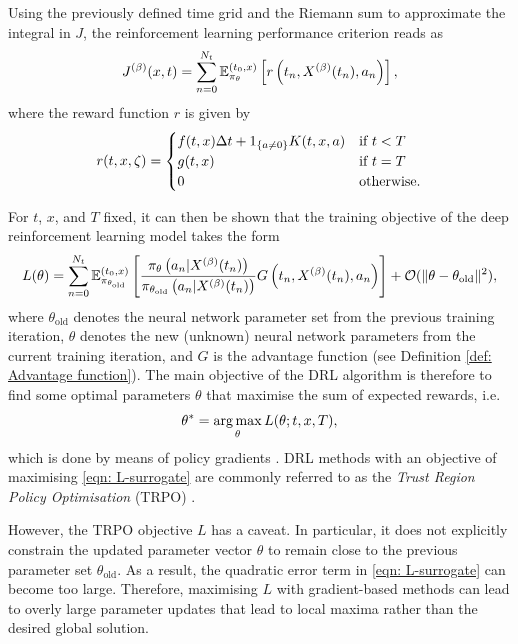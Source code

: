 Using the previously defined time grid and the Riemann sum to approximate the integral in $J$, the reinforcement learning performance criterion reads as
\begin{equation*}
    J^{(\beta)}(x,t) = \sum_{n=0}^{N_t} \mathbb{E}^{(t_0,x)}_{\pi_\theta} \left[ r\left(t_n, X^{(\beta)}(t_n), a_n \right) \right],
\end{equation*}
where the reward function $r$ is given by
\begin{equation}
    r(t,x,\zeta) = 
    \begin{cases} 
        f(t,x) \Delta t + 1_{\left\{a \neq 0\right\}} K(t,x,a) & \text{if } t < T \\
        g(t,x) & \text{if } t=T \\
        0 & \text{otherwise}.
    \end{cases}
\end{equation}

For $t$, $x$, and $T$ fixed, it can then be shown that the training objective of the deep reinforcement learning model takes the form
\begin{equation}
    L(\theta) = \sum_{n=0}^{N_t}\mathbb{E}^{(t_0,x)}_{\pi_{\theta_\text{old}}} \left[\frac{\pi_\theta\left(a_n | X^{(\beta)}(t_n)\right)}{\pi_{\theta_\text{old}}\left(a_n | X^{(\beta)}(t_n)\right)} G\left (t_n,X^{(\beta)}(t_n),a_n \right) \right] + \mathcal{O}(\lVert \theta - \theta_\text{old} \rVert^2),
    \label{eqn: L-surrogate}
\end{equation}
where $\theta_{\text{old}}$ denotes the neural network parameter set from the previous training iteration, $\theta$ denotes the new (unknown) neural network parameters from the current training iteration, and $G$ is the advantage function (see Definition \ref{def: Advantage function}). The main objective of the DRL algorithm is therefore to find some optimal parameters $\theta$ that maximise the sum of expected rewards, i.e. 
\begin{equation*}
    \theta^* = \operatorname*{arg\,max}_{\theta} L(\theta; t,x,T),
\end{equation*}
which is done by means of policy gradients \cite{sutton1999policy}. DRL methods with an objective of maximising \eqref{eqn: L-surrogate} are commonly referred to as the \emph{Trust Region Policy Optimisation} (TRPO) \cite{schulman2015trust}.

However, the TRPO objective $L$ has a caveat. In particular, it does not explicitly constrain the updated parameter vector $\theta$ to remain close to the previous parameter set $\theta_{\text{old}}$. As a result, the quadratic error term in \eqref{eqn: L-surrogate} can become too large. Therefore, maximising $L$ with gradient-based methods can lead to overly large parameter updates that lead to local maxima rather than the desired global solution.

